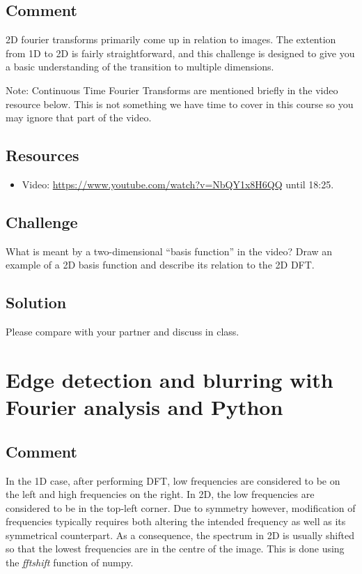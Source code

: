 \subsection*{Comment}
2D fourier transforms primarily come up in relation to images. The extention from 1D to 2D is fairly straightforward, and this challenge is designed to give you a basic understanding of the transition to multiple dimensions.

Note: Continuous Time Fourier Transforms are mentioned briefly in the video resource below. This is not something we have time to cover in this course so you may ignore that part of the video.

\subsection*{Resources}
\begin{itemize}
    \item Video: \url{https://www.youtube.com/watch?v=NbQY1x8H6QQ} until 18:25.
\end{itemize}

\subsection*{Challenge}
What is meant by a two-dimensional ``basis function'' in the video? Draw an example of a 2D basis function and describe its relation to the 2D DFT.

\subsection*{Solution}
Please compare with your partner and discuss in class.




\newpage
\section{Edge detection and blurring with Fourier analysis and Python}

\subsection*{Comment}
In the 1D case, after performing DFT, low frequencies are considered to be on the left and high frequencies on the right.
In 2D, the low frequencies are considered to be in the top-left corner.
Due to symmetry however, modification of frequencies typically requires both altering the intended frequency as well as its symmetrical counterpart.
As a consequence, the spectrum in 2D is usually shifted so that the lowest frequencies are in the centre of the image. This is done using the \emph{fftshift} function of numpy.

